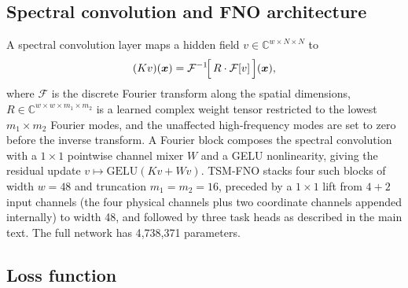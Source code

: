 \documentclass[11pt,letterpaper]{article}
\newcommand{\C}{\mathbb{C}}
\newcommand{\FT}{\mathcal{F}}
\newcommand{\IFT}{\mathcal{F}^{-1}}
\newcommand{\xvec}{\bm{x}}
\begin{document}
\subsection*{Spectral convolution and FNO architecture}
\label{sec:methods-fno}

A spectral convolution layer maps a hidden field
$v\in\C^{w\times N\times N}$ to
\begin{equation}
(K v)(\xvec) =
\IFT\!\Bigl[\,R\cdot\FT[v]\,\Bigr](\xvec),
\label{eq:spectral}
\end{equation}
where $\FT$ is the discrete Fourier transform along the spatial
dimensions, $R\in\C^{w\times w\times m_{1}\times m_{2}}$ is a learned
complex weight tensor restricted to the lowest $m_{1}\times m_{2}$ Fourier
modes, and the unaffected high-frequency modes are set to zero before the
inverse transform. A Fourier block composes the spectral convolution with
a $1\!\times\!1$ pointwise channel mixer $W$ and a GELU
nonlinearity, giving the residual update
$v \mapsto \mathrm{GELU}(Kv+Wv)$. TSM-FNO stacks four such blocks of
width $w=48$ and truncation $m_{1}=m_{2}=16$, preceded by a $1\!\times\!1$
lift from $4{+}2$ input channels (the four physical channels plus two
coordinate channels appended internally) to width 48, and followed by
three task heads as described in the main text. The full network has
4{,}738{,}371 parameters.

\subsection*{Loss function}
\label{sec:methods-loss}
\end{document}
